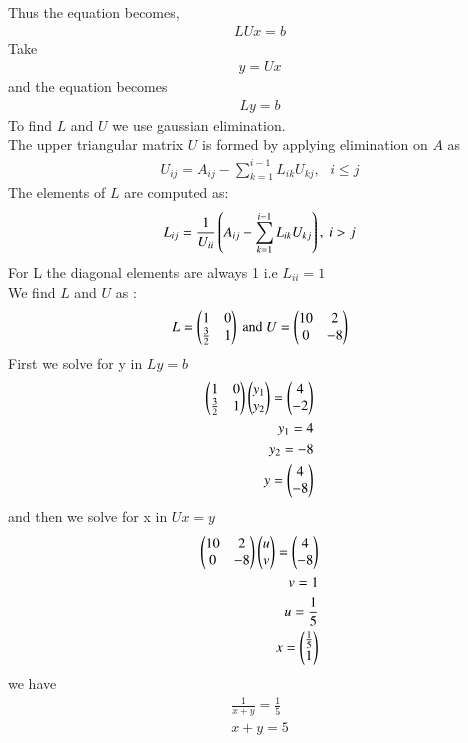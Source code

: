 \documentclass[journal]{IEEEtran}
\begin{document}
Thus the equation becomes,
\begin{align}
    LUx=b
\end{align}
Take 
\begin{align}
    y=Ux
\end{align}
and the equation becomes
\begin{align}
    Ly=b
\end{align}
To find $L$ and $U$ we use gaussian elimination.\\The upper triangular matrix $U$ is formed by applying elimination on $A$ as
\begin{align}
    U_{ij}=A_{ij}-\sum_{k=1}^{i-1}L_{ik}U_{kj}, \text{ } i\le j
\end{align}
The elements of $L$ are computed as:
\begin{align}
    L_{ij}=\frac{1}{U_{ii}}\left(A_{ij}-\sum_{k=1}^{i-1}L_{ik}U_{kj}\right), \text{ } i>j
\end{align}
For L the diagonal elements are always 1 i.e $L_{ii}=1$\\
We find $L$ and $U$ as :
\begin{align}
    L=\begin{pmatrix}1 & 0 \\ \frac{3}{2} & 1\end{pmatrix} \text{ and } U=\begin{pmatrix}10 & 2 \\ 0 & -8\end{pmatrix}
\end{align}
First we solve for y in  $Ly=b$\\ 
\begin{align}
    \begin{pmatrix}1 & 0 \\ \frac{3}{2} & 1\end{pmatrix}\begin{pmatrix}y_1 \\ y_2\end{pmatrix}=\begin{pmatrix}4\\-2\end{pmatrix}\\
    y_1=4\\y_2=-8\\ y=\begin{pmatrix}4 \\ -8\end{pmatrix}
\end{align}
and then we solve for x in $Ux=y$\\
\begin{align}
    \begin{pmatrix}10 & 2 \\ 0 & -8\end{pmatrix}\begin{pmatrix}u \\ v\end{pmatrix} = \begin{pmatrix}4 \\ -8\end{pmatrix}\\
    v=1\\u=\frac{1}{5}\\ x=\begin{pmatrix}\frac{1}{5} \\ 1\end{pmatrix}
\end{align}
we have 
\begin{align}
    \frac{1}{x+y}=\frac{1}{5}\\
    x+y=5
\end{align}
\end{document}
